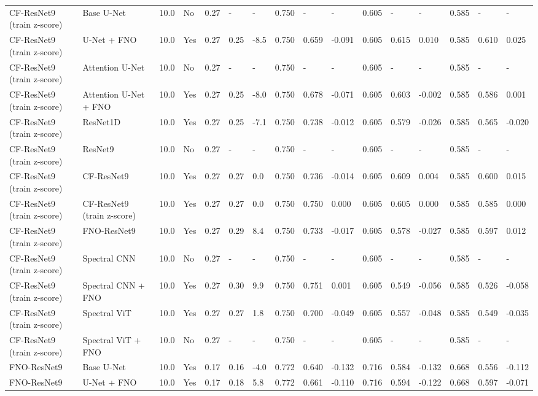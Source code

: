 \begin{longtable}{llllllllllllllll}
CF-ResNet9 (train z-score) & Base U-Net & 10.0 & No & 0.27 & - & - & 0.750 & - & - & 0.605 & - & - & 0.585 & - & - \\
CF-ResNet9 (train z-score) & U-Net + FNO & 10.0 & Yes & 0.27 & 0.25 & -8.5 & 0.750 & 0.659 & -0.091 & 0.605 & 0.615 & 0.010 & 0.585 & 0.610 & 0.025 \\
CF-ResNet9 (train z-score) & Attention U-Net & 10.0 & No & 0.27 & - & - & 0.750 & - & - & 0.605 & - & - & 0.585 & - & - \\
CF-ResNet9 (train z-score) & Attention U-Net + FNO & 10.0 & Yes & 0.27 & 0.25 & -8.0 & 0.750 & 0.678 & -0.071 & 0.605 & 0.603 & -0.002 & 0.585 & 0.586 & 0.001 \\
CF-ResNet9 (train z-score) & ResNet1D & 10.0 & Yes & 0.27 & 0.25 & -7.1 & 0.750 & 0.738 & -0.012 & 0.605 & 0.579 & -0.026 & 0.585 & 0.565 & -0.020 \\
CF-ResNet9 (train z-score) & ResNet9 & 10.0 & No & 0.27 & - & - & 0.750 & - & - & 0.605 & - & - & 0.585 & - & - \\
CF-ResNet9 (train z-score) & CF-ResNet9 & 10.0 & Yes & 0.27 & 0.27 & 0.0 & 0.750 & 0.736 & -0.014 & 0.605 & 0.609 & 0.004 & 0.585 & 0.600 & 0.015 \\
CF-ResNet9 (train z-score) & CF-ResNet9 (train z-score) & 10.0 & Yes & 0.27 & 0.27 & 0.0 & 0.750 & 0.750 & 0.000 & 0.605 & 0.605 & 0.000 & 0.585 & 0.585 & 0.000 \\
CF-ResNet9 (train z-score) & FNO-ResNet9 & 10.0 & Yes & 0.27 & 0.29 & 8.4 & 0.750 & 0.733 & -0.017 & 0.605 & 0.578 & -0.027 & 0.585 & 0.597 & 0.012 \\
CF-ResNet9 (train z-score) & Spectral CNN & 10.0 & No & 0.27 & - & - & 0.750 & - & - & 0.605 & - & - & 0.585 & - & - \\
CF-ResNet9 (train z-score) & Spectral CNN + FNO & 10.0 & Yes & 0.27 & 0.30 & 9.9 & 0.750 & 0.751 & 0.001 & 0.605 & 0.549 & -0.056 & 0.585 & 0.526 & -0.058 \\
CF-ResNet9 (train z-score) & Spectral ViT & 10.0 & Yes & 0.27 & 0.27 & 1.8 & 0.750 & 0.700 & -0.049 & 0.605 & 0.557 & -0.048 & 0.585 & 0.549 & -0.035 \\
CF-ResNet9 (train z-score) & Spectral ViT + FNO & 10.0 & No & 0.27 & - & - & 0.750 & - & - & 0.605 & - & - & 0.585 & - & - \\
FNO-ResNet9 & Base U-Net & 10.0 & Yes & 0.17 & 0.16 & -4.0 & 0.772 & 0.640 & -0.132 & 0.716 & 0.584 & -0.132 & 0.668 & 0.556 & -0.112 \\
FNO-ResNet9 & U-Net + FNO & 10.0 & Yes & 0.17 & 0.18 & 5.8 & 0.772 & 0.661 & -0.110 & 0.716 & 0.594 & -0.122 & 0.668 & 0.597 & -0.071 \\

\end{longtable}
